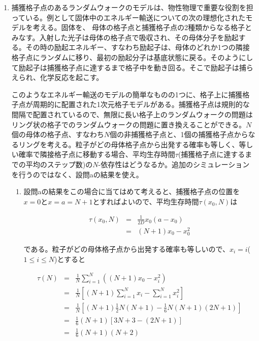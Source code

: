 \documentclass{jsarticle}
\begin{document}
\begin{enumerate}
\begin{enumerate}
                    
                    
                    
                \end{enumerate}
                
            \item  捕獲格子点のあるランダムウォークのモデルは、物性物理で重要な役割を担っている。例として固体中のエネルギー輸送についての次の理想化されたモデルを考える。固体を、 母体の格子点と捕獲格子点の2種類からなる格子とみなす。入射した光子は母体の格子点で吸収され、その母体分子を励起する。その時の励起エネルギー、すなわち励起子は、母体のどれか1つの隣接格子点にランダムに移り、最初の励起分子は基底状態に戻る。そのようにして励起子は捕獲格子点に達するまで格子中を動き回る。そこで励起子は捕らえられ、化学反応を起こす。
            
            このようなエネルギー輸送のモデルの簡単なものの1つに、格子上に捕獲格子点が周期的に配置された1次元格子モデルがある。捕獲格子点は規則的な間隔で配置されているので、無限に長い格子上のランダムウォークの問題はリング状の格子でのランダムウォークの問題に置き換えることができる。$N$個の母体の格子点、すなわち$N$個の非捕獲格子点と、1個の捕獲格子点からなるリングを考える。粒子がどの母体格子点から出発する確率も等しく、等しい確率で隣接格子点に移動する場合、平均生存時間$\tau$(捕獲格子点に達するまでの平均のステップ数)の$N$-依存性はどうなるか。追加のシミュレーションを行うのではなく、設問aの結果を使え。
            
                \begin{enumerate}
                    \item 設問aの結果をこの場合に当てはめて考えると、捕獲格子点の位置を$x=0$と$x=a=N+1$とすればよいので、平均生存時間$\tau(x_{0},N)$は
                    
                    \begin{eqnarray*}
                        \tau(x_{0}, N) &=& \frac{1}{2D}x_{0}(a-x_{0}) \\
                        &=& (N+1)x_{0}-x_{0}^{2}
                    \end{eqnarray*}
                    
                    である。粒子がどの母体格子点から出発する確率も等しいので、$x_{i}=i$($1 \le i \le N$)とすると
                    
                    \begin{eqnarray*}
                        \tau(N) &=& \frac{1}{N}\sum_{i=1}^{N}\left( (N+1)x_{0}-x_{i}^{2}\right) \\
                        &=& \frac{1}{N}\left[ (N+1)\sum_{i=1}^{N}x_{i}-\sum_{i=1}^{N}x_{i}^{2}\right] \\
                        &=& \frac{1}{N}\left[ (N+1)\frac{1}{2}N(N+1)-\frac{1}{6}N(N+1)(2N+1)\right] \\
                        &=& \frac{1}{6}(N+1)\left[ 3N+3-(2N+1)\right] \\
                        &=& \frac{1}{6}(N+1)(N+2)
                    \end{eqnarray*}
                    

\end{enumerate}
\end{enumerate}
\end{document}
